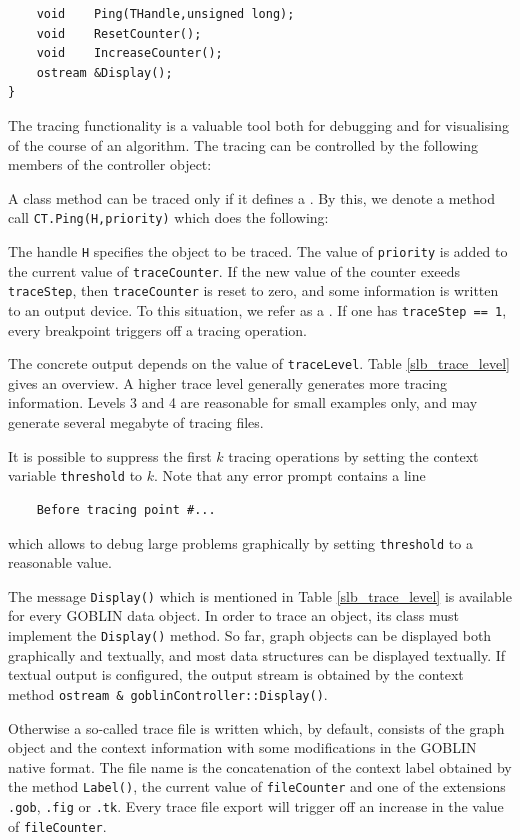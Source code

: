 \documentclass[a4paper,11pt,twoside]{book}
\begin{document}
\begin{multicols}{2}
\begin{mymethods}
\begin{verbatim}
    void    Ping(THandle,unsigned long);
    void    ResetCounter();
    void    IncreaseCounter();
    ostream &Display();
}
\end{verbatim}
\end{mymethods}
The tracing functionality is a valuable tool both for debugging and for
visualising of the course of an algorithm. The tracing can be controlled
by the following members of the controller object:

A class method can be traced only if it defines a . By this,
we denote a method call \verb/CT.Ping(H,priority)/ which does the following:

The handle \verb/H/ specifies the object to be traced.
The value of \verb/priority/ is added to the current value of
\verb/traceCounter/. If the new value of the counter exeeds \verb/traceStep/,
then \verb/traceCounter/ is reset to zero, and some information
is written to an output device. To this situation, we refer as a
. If one has \verb/traceStep == 1/, every breakpoint triggers
off a tracing operation.

The concrete output depends on the value of \verb/traceLevel/. Table
\ref{slb_trace_level} gives an overview. A higher trace level generally
generates more tracing information. Levels 3 and 4 are reasonable for small
examples only, and may generate several megabyte of tracing files.

It is possible to suppress the first $k$ tracing operations
by setting the context variable \verb/threshold/ to $k$. Note that any
error prompt contains a line
\begin{verbatim}
    Before tracing point #...
\end{verbatim}
which allows to debug large problems graphically by setting \verb/threshold/
to a reasonable value.

The message \verb/Display()/ which is mentioned in Table \ref{slb_trace_level}
is available for every GOBLIN data object. In order to trace an object, its
class must implement the \verb/Display()/ method. So far, graph objects can be
displayed both graphically and textually, and most data structures can
be displayed textually. If textual output is configured, the output stream
is obtained by the context method \verb/ostream & goblinController::Display()/.

Otherwise a so-called {trace file} is written which, by default, consists of
the graph object and the context information with some modifications in the
GOBLIN native format. The file name is the concatenation of the context label
obtained by the method \verb/Label()/, the current value of \verb/fileCounter/
and one of the extensions \verb/.gob/, \verb/.fig/ or \verb/.tk/. Every trace
file export will trigger off an increase in the value of \verb/fileCounter/. 


\end{multicols}
\end{document}
